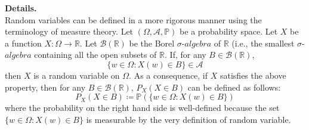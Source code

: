 \documentclass[twoside]{article}
\theoremstyle{definition}
\theoremstyle{remark}
\theoremstyle{remark}
\begin{document}
\textbf{Details.} \\
Random variables can be defined in a more rigorous manner using the terminology
of measure theory. Let $(\Omega, \mathcal{A}, \mathbb{P})$ be a probability space.
Let $X$ be a function $X: \Omega \rightarrow \mathbb{R}$. Let $\mathcal{B}(\mathbb{R})$
be the Borel $\sigma$-$algebra$ of $\mathbb{R}$ (i.e., the smallest $\sigma$-$algebra$
containing all the open subsets of $\mathbb{R}$. If, for any $B \in \mathcal{B}(\mathbb{R})$,
\begin{equation}
  \{w \in \Omega : X(w) \in B\} \in \mathcal{A}
\end{equation}
then $X$ is a random variable on $\Omega$. As a consequence, if $X$ satisfies the
above property, then for any $B \in \mathcal{B}(\mathbb{R})$, $P_X(X \in B)$ can
be defined as follows:
\begin{equation}
  P_X(X \in B) \coloneqq \mathbb{P}(\{w \in \Omega : X(w) \in B\})
\end{equation}
where the probability on the right hand side is well-defined because the set
$\{w \in \Omega : X(w) \in B\}$ is measurable by the very definition of random
variable.


\printbibliography

\end{document}

